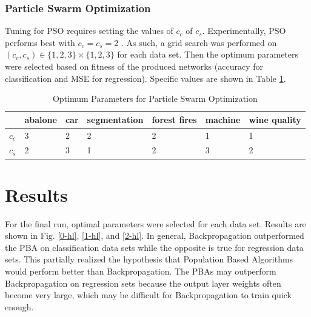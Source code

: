 \documentclass[twoside,11pt]{article}
\begin{document}
\subsubsection{Particle Swarm Optimization}

	Tuning for PSO requires setting the values of $c_c$ of $c_s$.
	Experimentally, PSO performs best with $c_c = c_s = 2$ \citep{empirical-pso}.
	As such, a grid search was performed on $ (c_c, c_s) \in \{ 1, 2, 3 \} \times \{ 1, 2, 3 \} $ for each data set.
	Then the optimum parameters were selected based on fitness of the produced networks (accuracy for classification and MSE for regression).
	Specific values are shown in Table \ref{pso-tuning-table}.
	\begin{table}[h]
		\centering
		\begin{tabular}{|l|l|l|l|l|l|l|}
			\hline
			       & abalone & car & segmentation & forest fires & machine & wine quality  \\ \hline
			$c_c$  &       3 &   2 &            2 &            2 &       1 &            1  \\ \hline
			$c_s$  &       2 &   3 &            1 &            2 &       3 &            2  \\ \hline
		\end{tabular}
		\caption{Optimum Parameters for Particle Swarm Optimization}
		\label{pso-tuning-table}
	\end{table}

\section{Results}

	For the final run, optimal parameters were selected for each data set. 
	Results are shown in Fig. \ref{0-hl}, \ref{1-hl}, and \ref{2-hl}. 
	In general, Backpropagation outperformed the PBA on classification data sets while the opposite is true for regression data sets. 
	This partially realized the hypothesis that Population Based Algorithms would perform better than Backpropagation. 
	The PBAs may outperform Backpropagation on regression sets because the output layer weights often become very large, which may be difficult for Backpropagation to train quick enough.
\end{document}
